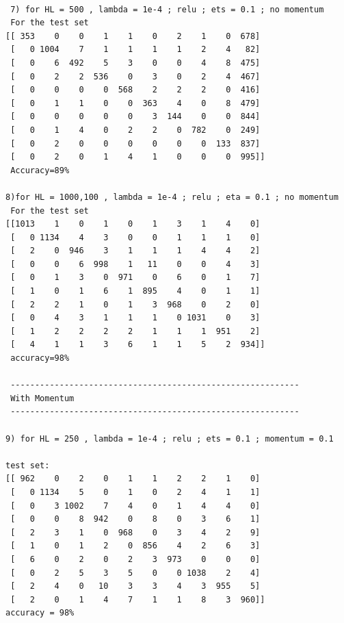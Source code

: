 \documentclass[conference]{IEEEtran}
\begin{document}
 \begin{verbatim}
 
 7) for HL = 500 , lambda = 1e-4 ; relu ; ets = 0.1 ; no momentum
 For the test set
[[ 353    0    0    1    1    0    2    1    0  678]
 [   0 1004    7    1    1    1    1    2    4   82]
 [   0    6  492    5    3    0    0    4    8  475]
 [   0    2    2  536    0    3    0    2    4  467]
 [   0    0    0    0  568    2    2    2    0  416]
 [   0    1    1    0    0  363    4    0    8  479]
 [   0    0    0    0    0    3  144    0    0  844]
 [   0    1    4    0    2    2    0  782    0  249]
 [   0    2    0    0    0    0    0    0  133  837]
 [   0    2    0    1    4    1    0    0    0  995]]
 Accuracy=89%
 
8)for HL = 1000,100 , lambda = 1e-4 ; relu ; eta = 0.1 ; no momentum
 For the test set
[[1013    1    0    1    0    1    3    1    4    0]
 [   0 1134    4    3    0    0    1    1    1    0]
 [   2    0  946    3    1    1    1    4    4    2]
 [   0    0    6  998    1   11    0    0    4    3]
 [   0    1    3    0  971    0    6    0    1    7]
 [   1    0    1    6    1  895    4    0    1    1]
 [   2    2    1    0    1    3  968    0    2    0]
 [   0    4    3    1    1    1    0 1031    0    3]
 [   1    2    2    2    2    1    1    1  951    2]
 [   4    1    1    3    6    1    1    5    2  934]]
 accuracy=98%

 -----------------------------------------------------------
 With Momentum
 -----------------------------------------------------------
 
9) for HL = 250 , lambda = 1e-4 ; relu ; ets = 0.1 ; momentum = 0.1

test set:
[[ 962    0    2    0    1    1    2    2    1    0]
 [   0 1134    5    0    1    0    2    4    1    1]
 [   0    3 1002    7    4    0    1    4    4    0]
 [   0    0    8  942    0    8    0    3    6    1]
 [   2    3    1    0  968    0    3    4    2    9]
 [   1    0    1    2    0  856    4    2    6    3]
 [   6    0    2    0    2    3  973    0    0    0]
 [   0    2    5    3    5    0    0 1038    2    4]
 [   2    4    0   10    3    3    4    3  955    5]
 [   2    0    1    4    7    1    1    8    3  960]]
accuracy = 98%
\end{verbatim}
 \newpage
\end{document}
